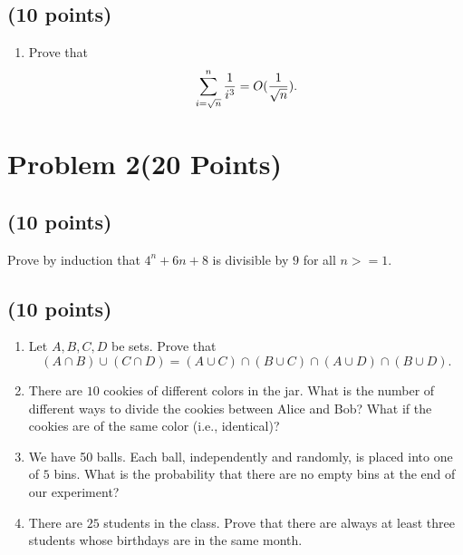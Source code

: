 \documentclass[letterpaper, 11pt]{article}
\begin{document}
\subsection{(10 points)}

\begin{enumerate}

\item Prove that $$\sum_{i=\sqrt{n}}^n {1\over i^3} = O({1\over \sqrt{n}}).$$


\end{enumerate}

\section{Problem 2(20 Points)}

\subsection{(10 points)}

Prove by induction that $4
^n+6n +8$ is divisible by $9$ for all $n >= 1$.


\subsection{(10 points)}

\begin{enumerate}

\item Let $A,B,C,D$ be sets. Prove that $$(A\cap B) \cup (C\cap D) = (A\cup C) \cap (B\cup C) \cap (A\cup D) \cap (B\cup D).$$

\item There are $10$ cookies of different colors in the jar. What is the number of different ways to divide the cookies between Alice and Bob? What if the cookies are of the same color (i.e., identical)?

\item We have 50 balls. Each ball, independently and randomly, is placed into one of $5$ bins. What is the probability that there are no empty bins at the end of our experiment?

\item There are $25$ students in the class. Prove that there are always at least three
students whose birthdays are in the same month.
\end{enumerate}
\end{document}
